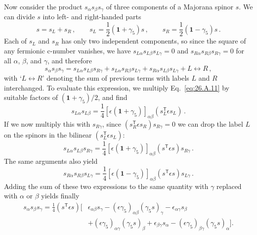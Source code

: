 Now consider the product $s_\alpha s_\beta s_\gamma$ of three components of
a Majorana spinor $s$. We can divide $s$ into left- and right-handed parts
\begin{equation}
  s=s_L+s_R\,,
  \qquad
  s_L=\frac12(\mathbf{1}+\gamma_5)s\,,
  \qquad
  s_R=\frac12(\mathbf{1}-\gamma_5)s\,.
  \tag{26.A.12}\label{eq:26.A.12}
\end{equation}
Each of $s_L$ and $s_R$ has only two independent components, so since the
square of any fermionic c-number vanishes, we have
$s_{L\alpha}s_{L\beta}s_{L\gamma}=0$ and
$s_{R\alpha}s_{R\beta}s_{R\gamma}=0$ for all $\alpha$, $\beta$, and
$\gamma$, and therefore
\[
  s_\alpha s_\beta s_\gamma
  =s_{L\alpha}s_{L\beta}s_{R\gamma}
   +s_{L\alpha}s_{R\beta}s_{L\gamma}
   +s_{R\alpha}s_{L\beta}s_{L\gamma}
   +L\leftrightarrow R\,,
\]
with `$L\leftrightarrow R$' denoting the sum of previous terms with labels
$L$ and $R$ interchanged. To evaluate this expression, we multiply
Eq.~\eqref{eq:26.A.11} by suitable factors of
$(\mathbf{1}+\gamma_5)/2$, and find
\[
  s_{L\alpha}s_{L\beta}
  =\frac14[\epsilon(\mathbf{1}+\gamma_5)]_{\alpha\beta}
   (s_L^{\mathsf T}\epsilon s_L)\,.
\]
If we now multiply this with $s_{R\gamma}$, since
$(s_R^{\mathsf T}\epsilon s_R)s_{R\gamma}=0$ we can drop the label $L$ on the spinors
in the bilinear $(s_L^{\mathsf T}\epsilon s_L)$:
\[
  s_{L\alpha}s_{L\beta}s_{R\gamma}
  =\frac14[\epsilon(\mathbf{1}+\gamma_5)]_{\alpha\beta}
   (s^{\mathsf T}\epsilon s)s_{R\gamma}\,.
\]
The same arguments also yield
\[
  s_{R\alpha}s_{R\beta}s_{L\gamma}
  =\frac14[\epsilon(\mathbf{1}-\gamma_5)]_{\alpha\beta}
   (s^{\mathsf T}\epsilon s)s_{L\gamma}\,.
\]
Adding the sum of these two expressions to the same quantity with $\gamma$
replaced with $\alpha$ or $\beta$ yields finally
\begin{equation}
\begin{aligned}
  s_\alpha s_\beta s_\gamma
  =\frac14(s^{\mathsf T}\epsilon s)\bigl[
    &\epsilon_{\alpha\beta}s_\gamma
     -(\epsilon\gamma_5)_{\alpha\beta}(\gamma_5s)_\gamma
     -\epsilon_{\alpha\gamma}s_\beta
  \\
    &+(\epsilon\gamma_5)_{\alpha\gamma}(\gamma_5s)_\beta
     +\epsilon_{\beta\gamma}s_\alpha
     -(\epsilon\gamma_5)_{\beta\gamma}(\gamma_5s)_\alpha
  \bigr].
\end{aligned}
  \tag{26.A.13}\label{eq:26.A.13}
\end{equation}

